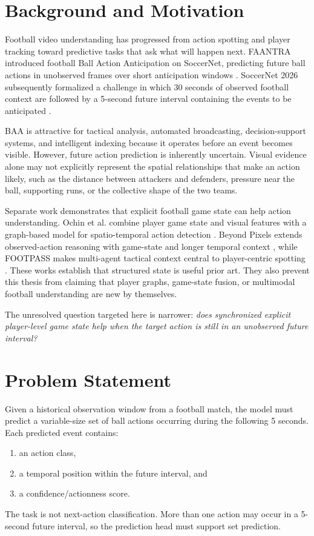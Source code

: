 \documentclass[11pt,a4paper]{article}
\begin{document}
\tableofcontents
\newpage

\section{Background and Motivation}
Football video understanding has progressed from action spotting and player tracking toward predictive tasks that ask what will happen next. FAANTRA introduced football Ball Action Anticipation on SoccerNet, predicting future ball actions in unobserved frames over short anticipation windows \citep{dalal2025faantra}. SoccerNet 2026 subsequently formalized a challenge in which 30 seconds of observed football context are followed by a 5-second future interval containing the events to be anticipated \citep{cioppa2026soccernet}.

BAA is attractive for tactical analysis, automated broadcasting, decision-support systems, and intelligent indexing because it operates before an event becomes visible. However, future action prediction is inherently uncertain. Visual evidence alone may not explicitly represent the spatial relationships that make an action likely, such as the distance between attackers and defenders, pressure near the ball, supporting runs, or the collective shape of the two teams.

Separate work demonstrates that explicit football game state can help action understanding. Ochin et al. combine player game state and visual features with a graph-based model for spatio-temporal action detection \citep{ochin2025gamestate}. Beyond Pixels extends observed-action reasoning with game-state and longer temporal context \citep{ochin2025beyond}, while FOOTPASS makes multi-agent tactical context central to player-centric spotting \citep{ochin2025footpass}. These works establish that structured state is useful prior art. They also prevent this thesis from claiming that player graphs, game-state fusion, or multimodal football understanding are new by themselves.

The unresolved question targeted here is narrower: \textit{does synchronized explicit player-level game state help when the target action is still in an unobserved future interval?}

\section{Problem Statement}
Given a historical observation window from a football match, the model must predict a variable-size set of ball actions occurring during the following 5 seconds. Each predicted event contains:
\begin{enumerate}
  \item an action class,
  \item a temporal position within the future interval, and
  \item a confidence/actionness score.
\end{enumerate}
The task is not next-action classification. More than one action may occur in a 5-second future interval, so the prediction head must support set prediction.
\end{document}
